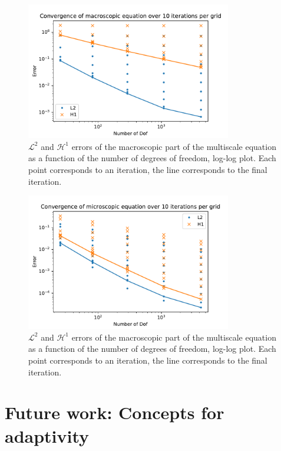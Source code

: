 \documentclass{article}
\renewcommand{\L}{\mathcal{ L}}
\renewcommand{\H}{\mathcal{ H}}
\begin{document}
\begin{figure}[ht]
    \centering
    \includegraphics[width=0.8\textwidth]{multiscale_macro.pdf}
    \caption{$\L^2$ and $\H^1$ errors of the macroscopic part of the multiscale equation as a function of the number of degrees of freedom, log-log plot. Each point corresponds to an iteration, the line corresponds to the final iteration.}
    \label{fig:multiscale_macro}
\end{figure}

\begin{figure}[ht]
    \centering
    \includegraphics[width=0.8\textwidth]{multiscale_micro.pdf}
    \caption{$\L^2$ and $\H^1$ errors of the macroscopic part of the multiscale equation as a function of the number of degrees of freedom, log-log plot. Each point corresponds to an iteration, the line corresponds to the final iteration.}
    \label{fig:multiscale_micro}
\end{figure}

\section{Future work: Concepts for adaptivity}
\label{sec:adaptivity}
\end{document}
